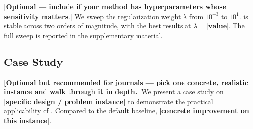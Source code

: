 \textbf{[Optional --- include if your method has hyperparameters whose
sensitivity matters.]} We sweep the regularization weight \(\lambda\)
from \(10^{-3}\) to \(10^{1}\). \method{} is stable across two orders
of magnitude, with the best results at \(\lambda = \textbf{[value]}\).
The full sweep is reported in the supplementary material.

\subsection{Case Study}
\label{sec:experiments:case}

\textbf{[Optional but recommended for journals --- pick one concrete,
realistic instance and walk through it in depth.]} We present a case
study on \textbf{[specific design / problem instance]} to demonstrate
the practical applicability of \method{}. Compared to the default
baseline, \method{} \textbf{[concrete improvement on this instance]}.
